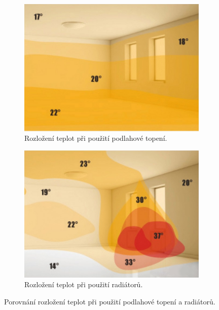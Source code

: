 \begin{figure}[h]
     \centering
     \begin{subfigure}[b]{0.45\textwidth}
         \centering
         \includegraphics[width=\textwidth]{images/rozlozeni-teplot-podlahove-vytapeni.png}
         \caption{Rozložení teplot při použití podlahové topení.}
         \label{fig:rozlozeni-teplot-podlahove-vytapeni}
     \end{subfigure}
     \hfill
     \begin{subfigure}[b]{0.45\textwidth}
         \centering
         \includegraphics[width=\textwidth]{images/rozlozeni-teplot-radiatory.png}
         \caption{Rozložení teplot při použití radiátorů.}
         \label{fig:rozlozeni-teplot-radiatory}
     \end{subfigure}
\caption{Porovnání rozložení teplot při použití podlahové topení a radiátorů.}
\label{fig:porovnani-rozlozeni-teplot}
\end{figure}

